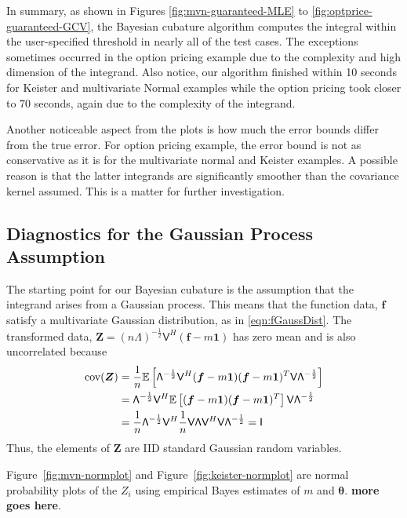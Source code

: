 \documentclass[twocolumn]{svjour3}          %
\newcommand{\bm}[1]{\boldsymbol{#1}}
\newcommand{\Ex}{\mathbb{E}}
\newcommand{\vtheta}{{\bm{\theta}}}
\newcommand{\vf}{\bm{f}}
\newcommand{\vZ}{\bm{Z}}
\newcommand{\vone}{\bm{1}}
\newcommand{\cov}{{\textup{cov}}}
\newcommand{\mLambda}{\mathsf{\Lambda}}
\newcommand{\mV}{\mathsf{V}}
\newcommand\figref{Figure~\ref}
\begin{document}
In summary,  as shown in Figures \ref{fig:mvn-guaranteed-MLE} to \ref{fig:optprice-guaranteed-GCV}, the Bayesian cubature algorithm computes the integral within the user-specified threshold in nearly all of the test cases.  The exceptions sometimes occurred in the option pricing example due to the complexity and high dimension of the integrand. 
Also notice, our algorithm finished within 10 seconds for Keister and multivariate Normal examples while the option pricing took closer to 70 seconds, again due to the complexity of the integrand.

Another noticeable aspect from the plots is how much the error bounds differ from the true error. For option pricing example, the error bound is not as conservative as it is for the multivariate normal and Keister examples. A possible reason is that the latter integrands are significantly smoother than the covariance kernel assumed.  This is a matter for further investigation.


\iffalse
\subsection{Diagnostics for the Gaussian Process Assumption}


The starting point for our Bayesian cubature is the assumption that the integrand arises from a Gaussian process. This means that the function data, $\vf$ satisfy a multivariate Gaussian distribution, as in \eqref{eqn:fGaussDist}.  The transformed data, $\vZ = ( n\mLambda)^{-\frac 12} \mV^H(\vf - m \vone)$ has zero mean and is also uncorrelated because
\begin{align*}
\cov (\vZ) 
&= \frac 1n \Ex\left[  
\mLambda^{-\frac 12} \mV^H (\vf - m \vone)
(\vf - m \vone)^T \mV \mLambda^{-\frac 12}
\right]
\\
&=
 \mLambda^{-\frac 12} \mV^H 
\Ex\left[ (\vf - m \vone)
(\vf - m \vone)^T \right] \mV \mLambda^{-\frac 12}
\\
&=
\frac{1}{n} \mLambda^{-\frac 12} \mV^H 
\frac 1n \mV \mLambda \mV^H \mV \mLambda^{-\frac 12}
 = \mathsf{I}
\end{align*}
Thus, the elements of $\vZ$ are IID standard Gaussian random variables.  

\figref{fig:mvn-normplot} and \figref{fig:keister-normplot} are normal probability plots of the $Z_i$ using empirical Bayes estimates of $m$ and $\vtheta$. \textbf{more goes here}.
\end{document}

